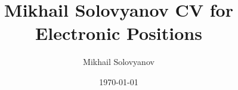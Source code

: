 \documentclass{article}
\title{ Mikhail Solovyanov CV for Electronic Positions}
\author{Mikhail Solovyanov}
\date{\today}
\begin{document}
 
\makecvtitle %




 
\end{document}
